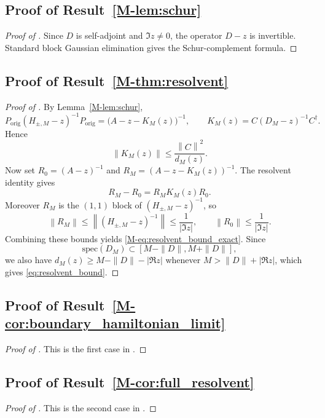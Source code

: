 \documentclass[11pt]{article}
\numberwithin{equation}{section}
\theoremstyle{definition}
\theoremstyle{remark}
\newcommand{\spec}{\mathrm{spec}}
\newcommand{\opnorm}[1]{\left\lVert#1\right\rVert}
\begin{document}
\subsection{Proof of Result~\ref{M-lem:schur}}\label{app:proof:lem:schur}
\begin{proof}[Proof of ]
Since $D$ is self-adjoint and $\Im z\neq0$, the operator $D-z$ is invertible. Standard block Gaussian elimination gives the Schur-complement formula.
\end{proof}

\subsection{Proof of Result~\ref{M-thm:resolvent}}\label{app:proof:thm:resolvent}
\begin{proof}[Proof of ]
By Lemma~\ref{M-lem:schur},
\[
P_{\mathrm{orig}}(H_{\pm,M}-z)^{-1}P_{\mathrm{orig}}
=\bigl(A-z-K_M(z)\bigr)^{-1},
\qquad
K_M(z)=C(D_M-z)^{-1}C^\dagger.
\]
Hence
\[
\opnorm{K_M(z)}\le \frac{\opnorm{C}^2}{d_M(z)}.
\]
Now set $R_0=(A-z)^{-1}$ and $R_M=(A-z-K_M(z))^{-1}$. The resolvent identity gives
\[
R_M-R_0=R_MK_M(z)R_0.
\]
Moreover $R_M$ is the $(1,1)$ block of $(H_{\pm,M}-z)^{-1}$, so
\[
\opnorm{R_M}\le \opnorm{(H_{\pm,M}-z)^{-1}}\le \frac1{|\Im z|},
\qquad
\opnorm{R_0}\le \frac1{|\Im z|}.
\]
Combining these bounds yields \eqref{M-eq:resolvent_bound_exact}. Since
\[
\spec(D_M)\subset [M-\|D\|,M+\|D\|],
\]
we also have $d_M(z)\ge M-\|D\|-|\Re z|$ whenever $M>\|D\|+|\Re z|$, which gives \eqref{eq:resolvent_bound}.
\end{proof}

\subsection{Proof of Result~\ref{M-cor:boundary_hamiltonian_limit}}\label{app:proof:cor:boundary_hamiltonian_limit}
\begin{proof}[Proof of ]
This is the first case in .
\end{proof}

\subsection{Proof of Result~\ref{M-cor:full_resolvent}}\label{app:proof:cor:full_resolvent}
\begin{proof}[Proof of ]
This is the second case in .
\end{proof}
\end{document}
